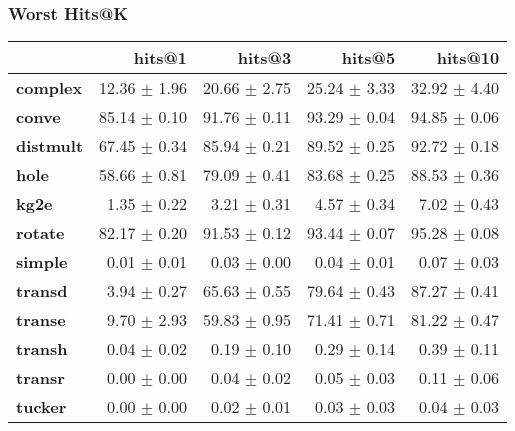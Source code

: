 \documentclass{article}
\begin{document}
    \subsubsection{Worst Hits@K}
    \begin{center}
    \begin{tabular}{lrrrr}
\toprule
{} &        hits@1 &        hits@3 &        hits@5 &       hits@10 \\
\midrule
\textbf{complex } &  12.36 $\pm$ 1.96 &  20.66 $\pm$ 2.75 &  25.24 $\pm$ 3.33 &  32.92 $\pm$ 4.40 \\
\textbf{conve   } &  85.14 $\pm$ 0.10 &  91.76 $\pm$ 0.11 &  93.29 $\pm$ 0.04 &  94.85 $\pm$ 0.06 \\
\textbf{distmult} &  67.45 $\pm$ 0.34 &  85.94 $\pm$ 0.21 &  89.52 $\pm$ 0.25 &  92.72 $\pm$ 0.18 \\
\textbf{hole    } &  58.66 $\pm$ 0.81 &  79.09 $\pm$ 0.41 &  83.68 $\pm$ 0.25 &  88.53 $\pm$ 0.36 \\
\textbf{kg2e    } &   1.35 $\pm$ 0.22 &   3.21 $\pm$ 0.31 &   4.57 $\pm$ 0.34 &   7.02 $\pm$ 0.43 \\
\textbf{rotate  } &  82.17 $\pm$ 0.20 &  91.53 $\pm$ 0.12 &  93.44 $\pm$ 0.07 &  95.28 $\pm$ 0.08 \\
\textbf{simple  } &   0.01 $\pm$ 0.01 &   0.03 $\pm$ 0.00 &   0.04 $\pm$ 0.01 &   0.07 $\pm$ 0.03 \\
\textbf{transd  } &   3.94 $\pm$ 0.27 &  65.63 $\pm$ 0.55 &  79.64 $\pm$ 0.43 &  87.27 $\pm$ 0.41 \\
\textbf{transe  } &   9.70 $\pm$ 2.93 &  59.83 $\pm$ 0.95 &  71.41 $\pm$ 0.71 &  81.22 $\pm$ 0.47 \\
\textbf{transh  } &   0.04 $\pm$ 0.02 &   0.19 $\pm$ 0.10 &   0.29 $\pm$ 0.14 &   0.39 $\pm$ 0.11 \\
\textbf{transr  } &   0.00 $\pm$ 0.00 &   0.04 $\pm$ 0.02 &   0.05 $\pm$ 0.03 &   0.11 $\pm$ 0.06 \\
\textbf{tucker  } &   0.00 $\pm$ 0.00 &   0.02 $\pm$ 0.01 &   0.03 $\pm$ 0.03 &   0.04 $\pm$ 0.03 \\
\bottomrule
\end{tabular}

    \end{center}
\end{document}
